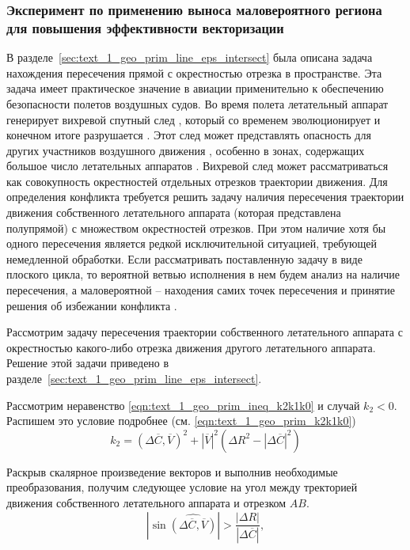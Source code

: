 \subsubsection{Эксперимент по применению выноса маловероятного региона для повышения эффективности векторизации}

В разделе~\ref{sec:text_1_geo_prim_line_eps_intersect} была описана задача нахождения пересечения прямой с окрестностью отрезка в пространстве.
Эта задача имеет практическое значение в авиации применительно к обеспечению безопасности полетов воздушных судов.
Во время полета летательный аппарат генерирует вихревой спутный след \cite{Aubakirov1999Wake}, который со временем эволюционирует и конечном итоге разрушается \cite{Vyshinsky2006Wake}.
Этот след может представлять опасность для других участников воздушного движения \cite{Babkin2008Wake}, особенно в зонах, содержащих большое число летательных аппаратов \cite{Burluzky2014Wake}.
Вихревой след может рассматриваться как совокупность окрестностей отдельных отрезков траектории движения.
Для определения конфликта требуется решить задачу наличия пересечения траектории движения собственного летательного аппарата (которая представлена полупрямой) с множеством окрестностей отрезков.
При этом наличие хотя бы одного пересечения является редкой исключительной ситуацией, требующей немедленной обработки.
Если рассматривать поставленную задачу в виде плоского цикла, то вероятной ветвью исполнения в нем будем анализ на наличие пересечения, а маловероятной -- находения самих точек пересечения и принятие решения об избежании конфликта \cite{Rybakov2017Flight,Rybakov2022VecGeom}.

Рассмотрим задачу пересечения траектории собственного летательного аппарата с окрестностью какого-либо отрезка движения другого летательного аппарата.
Решение этой задачи приведено в разделе~\ref{sec:text_1_geo_prim_line_eps_intersect}.

Рассмотрим неравенство \eqref{eqn:text_1_geo_prim_ineq_k2k1k0} и случай $k_2 < 0$.
Распишем это условие подробнее (см. \eqref{eqn:text_1_geo_prim_k2k1k0})
\begin{equation}
	k_2 = (\Delta \overline{C}, \overline{V})^2 + |\overline{V}|^2 \left( \Delta R^2 - |\Delta \overline{C}|^2 \right)
\end{equation}

Раскрыв скалярное произведение векторов и выполнив необходимые преобразования, получим следующее условие на угол между тректорией движения собственного летательного аппарата и отрезком $AB$.
\begin{equation}\label{eqn:text_4_vec_loc_branch_flight_cond}
	\left| \sin{\widehat{(\Delta \overline{C}, \overline{V})}} \right| > \frac{|\Delta R|}{|\Delta \overline{C}|},
\end{equation}

